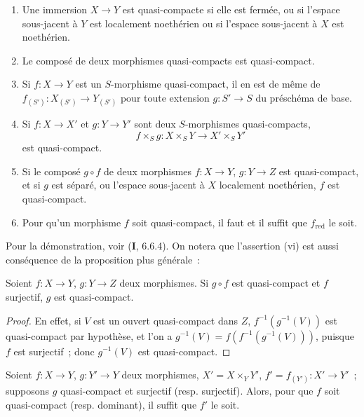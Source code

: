 \begin{proposition}[1.1.2]
\label{IV.1.1.2-fr}
\begin{enumerate}
  \item[\textup{(i)}] Une immersion $X\to Y$ est quasi-compacte si elle est fermée, ou si
  l'espace sous-jacent à $Y$ est localement noethérien ou si l'espace
  sous-jacent à $X$ est noethérien.
  \item[\textup{(ii)}] Le composé de deux morphismes quasi-compacts est quasi-compact.
  \item[\textup{(iii)}] Si $f:X\to Y$ est un $S$-morphisme quasi-compact, il en est de même de
  $f_{(S')}:X_{(S')}\to Y_{(S')}$ pour toute extension $g:S'\to S$ du
  préschéma de base.
  \item[\textup{(iv)}] Si $f:X\to X'$ et $g:Y\to Y'$ sont deux $S$-morphismes
  quasi-compacts,
  \[
    f\times_S g:X\times_S Y\to X'\times_S Y'
  \]
  est quasi-compact.
  \item[\textup{(v)}] Si le composé $g\circ f$ de deux morphismes $f:X\to Y$, $g:Y\to Z$
  est quasi-compact, et si $g$ est séparé, ou l'espace sous-jacent à $X$
  localement noethérien, $f$ est quasi-compact.
  \item[\textup{(vi)}] Pour qu'un morphisme $f$ soit quasi-compact, il faut et il suffit que
  $f_{\mathrm{red}}$ le soit.
\end{enumerate}
\end{proposition}

Pour la démonstration, voir (\textbf{I}, 6.6.4). On notera que l'assertion (vi) est
aussi conséquence de la proposition plus générale~:

\begin{proposition}[1.1.3]
\label{IV.1.1.3-fr}
Soient $f:X\to Y$, $g:Y\to Z$ deux morphismes. Si $g\circ f$ est
quasi-compact et $f$ surjectif, $g$ est quasi-compact.
\end{proposition}

\begin{proof}
En effet, si $V$ est un ouvert quasi-compact dans $Z$,
$f^{-1}(g^{-1}(V))$ est quasi-compact par hypothèse, et l'on a
$g^{-1}(V)=f(f^{-1}(g^{-1}(V)))$, puisque $f$ est surjectif~; donc
$g^{-1}(V)$ est quasi-compact.
\end{proof}

\begin{corollary}[1.1.4]
\label{IV.1.1.4-fr}
Soient $f:X\to Y$, $g:Y'\to Y$ deux morphismes, $X'=X\times_Y Y'$,
$f'=f_{(Y')}:X'\to Y'$~; supposons $g$ quasi-compact et surjectif \textup{(resp.}
surjectif\textup{)}. Alors, pour que $f$ soit quasi-compact \textup{(resp.} dominant\textup{)}, il suffit
que $f'$ le soit.
\end{corollary}


